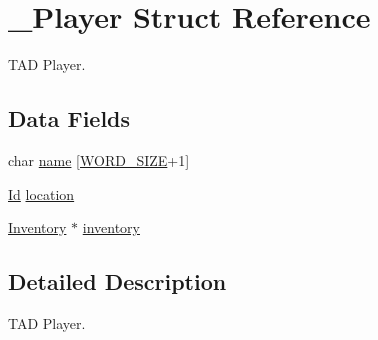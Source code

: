\hypertarget{struct___player}{\section{\+\_\+\+Player Struct Reference}
\label{struct___player}
}


T\+A\+D Player.  


\subsection*{Data Fields}
\begin{DoxyCompactItemize}
\item 
char \hyperlink{struct___player_a2b7341aac5f9360a8e88ae1061f497d2}{name} \mbox{[}\hyperlink{_types_8h_a92ed8507d1cd2331ad09275c5c4c1c89}{W\+O\+R\+D\+\_\+\+S\+I\+Z\+E}+1\mbox{]}
\item 
\hyperlink{_types_8h_a845e604fb28f7e3d97549da3448149d3}{Id} \hyperlink{struct___player_a5ef730c626751b65a24f4666d2c70a91}{location}
\item 
\hyperlink{_inventory_8h_a2253bf64ac4ce6a9c1d6f39c0b0d32a3}{Inventory} $\ast$ \hyperlink{struct___player_ae077c9247ee2900bd0a7f5528b73f150}{inventory}
\end{DoxyCompactItemize}


\subsection{Detailed Description}
T\+A\+D Player. 


\begin{DoxyItemize}
\item 
\end{DoxyItemize}

